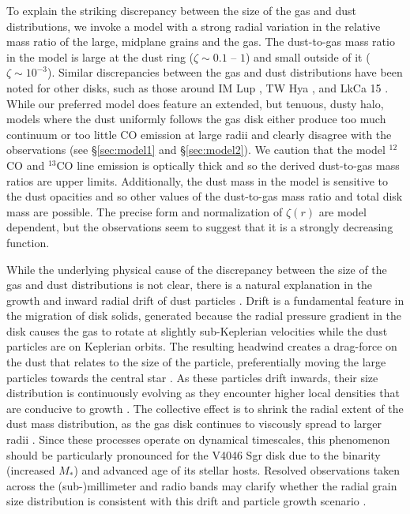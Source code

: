 {To explain the striking discrepancy between the size of the gas and dust 
distributions, we invoke a model with a strong radial variation in the relative 
mass ratio of the large, midplane grains and the gas.  The dust-to-gas mass
ratio in the model is large at the dust ring ($\zeta \sim 0.1$ -- $1$) and small
outside of it ($\zeta \sim 10^{-3}$).  Similar discrepancies between the gas and
dust distributions have been noted for other disks, such as those around IM Lup 
\citep{panic08}, TW Hya \citep{andrews12}, and LkCa 15 \citep{isella12}.
While our preferred model does feature an extended, but tenuous, dusty halo, 
models where the dust uniformly follows the gas disk either produce too much 
continuum or too little CO emission at large radii and clearly disagree with 
the observations (see \S\ref{sec:model1} and \S\ref{sec:model2}).  We caution 
that the model $^{12}$CO and $^{13}$CO line emission is optically thick and so 
the derived dust-to-gas mass ratios are upper limits.  Additionally, the dust 
mass in the model is sensitive to the dust opacities and so other values of the
dust-to-gas mass ratio and total disk mass are possible. The precise form and 
normalization of $\zeta(r)$ are model dependent, but the observations seem to 
suggest that it is a strongly decreasing function.

While the underlying physical cause of the discrepancy between the size of the 
gas and dust distributions is not clear, there is a 
natural explanation in the growth and inward radial drift of dust particles 
\citep{weidenschilling80,brauer08a,birnstiel10}.  Drift is a fundamental feature
in the migration of disk solids, generated because the radial pressure gradient
in the disk causes the gas to rotate at slightly sub-Keplerian velocities while 
the dust particles are on Keplerian orbits.  The resulting headwind creates a 
drag-force on the dust that relates to the size of the particle, preferentially
moving the large particles towards the central star \citep{weidenschilling77,
takeuchi02}.  As these particles drift inwards, their size distribution is 
continuously evolving as they encounter higher local densities that are 
conducive to growth \citep{birnstiel10}.  The collective effect is to shrink the
radial extent of the dust mass distribution, as the gas disk continues to
viscously spread to larger radii \citep{birnstiel12a}.  Since these processes 
operate on dynamical timescales, this phenomenon should be particularly 
pronounced for the V4046 Sgr disk due to the binarity (increased $M_*$) and 
advanced age of its stellar hosts.  Resolved observations taken across the 
(sub-)millimeter and radio bands may clarify whether the radial grain size 
distribution is consistent with this drift and particle growth scenario 
\citep{guilloteau11,perez12}.

}
